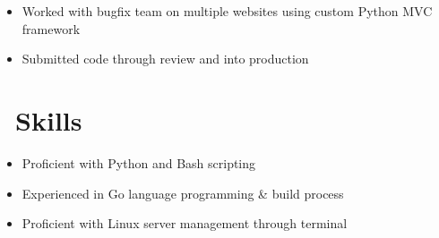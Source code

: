 \documentclass{resume}
\begin{document}
\begin{itemize}
  \item Worked with bugfix team on multiple websites using custom Python MVC framework
  \item Submitted code through review and into production
\end{itemize}

\section{\faCogs\ Skills}
\begin{itemize}[parsep=0.5ex]
  \item Proficient with Python and Bash scripting
  \item Experienced in Go language programming \& build process
  \item Proficient with Linux server management through terminal
\end{itemize}
\end{document}
